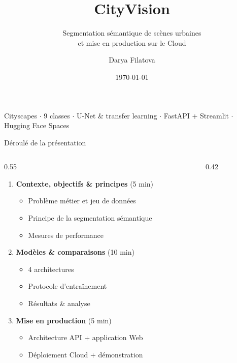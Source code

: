 \documentclass[aspectratio=169,11pt]{beamer}
\title[CityVision]{CityVision}
\subtitle{Segmentation sémantique de scènes urbaines\\ et mise en production sur le Cloud}
\author{Darya Filatova}
\institute{Projet 8 --- Ingénieur IA}
\date{\today}
\newcommand{\emphc}[1]{\textbf{\color{cvblue}#1}}
\begin{document}
\begin{frame}[plain]
  \titlepage
  \begin{center}
    \footnotesize\color{gray}
    Cityscapes $\cdot$ 9 classes $\cdot$ U-Net \& transfer learning $\cdot$ FastAPI + Streamlit $\cdot$ Hugging Face Spaces
  \end{center}
\end{frame}

\begin{frame}{Déroulé de la présentation}
  \begin{columns}[T]
    \begin{column}{0.55\textwidth}
      \begin{enumerate}
        \item \emphc{Contexte, objectifs \& principes} \hfill{\small(5 min)}
          \begin{itemize}\footnotesize
            \item Problème métier et jeu de données
            \item Principe de la segmentation sémantique
            \item Mesures de performance
          \end{itemize}
        \item \emphc{Modèles \& comparaisons} \hfill{\small(10 min)}
          \begin{itemize}\footnotesize
            \item 4 architectures
            \item Protocole d'entraînement
            \item Résultats \& analyse
          \end{itemize}
        \item \emphc{Mise en production} \hfill{\small(5 min)}
          \begin{itemize}\footnotesize
            \item Architecture API + application Web
            \item Déploiement Cloud + démonstration
          \end{itemize}
      \end{enumerate}
    \end{column}
    \begin{column}{0.42\textwidth}
      \centering
    \end{column}
  \end{columns}
\end{frame}
\end{document}
